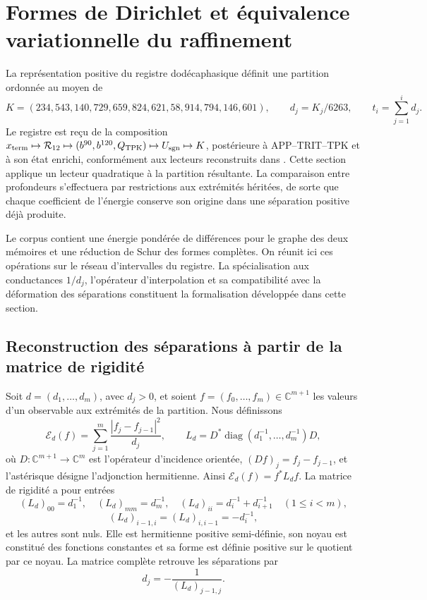 \section{Formes de Dirichlet et équivalence variationnelle du raffinement}
\label{sec:energia-refinamiento-k}

La représentation positive du registre dodécaphasique définit une partition ordonnée au moyen de
\[
 K=(234,543,140,729,659,824,621,58,914,794,146,601),
 \qquad d_j=K_j/6263,
 \qquad t_i=\sum_{j=1}^id_j.
\]
Le registre est reçu de la composition
\(x_{\rm term}\mapsto\mathcal R_{12}\mapsto
(b^{90},b^{120},Q_{\rm TPK})\mapsto U_{\rm sgn}\mapsto K\),
postérieure à APP--TRIT--TPK et à son état enrichi, conformément aux lecteurs
reconstruits dans \cite{hmtX}. Cette section applique
un lecteur quadratique à la partition résultante. La comparaison entre
profondeurs s’effectuera par restrictions aux extrémités héritées, de sorte
que chaque coefficient de l’énergie conserve son origine dans une séparation
positive déjà produite.

Le corpus contient une énergie pondérée de différences pour le graphe des
deux mémoires et une réduction de Schur des formes complètes. On
réunit ici ces opérations sur le réseau d’intervalles du registre. La
spécialisation aux conductances \(1/d_j\), l’opérateur d’interpolation
et sa compatibilité avec la déformation des séparations constituent
la formalisation développée dans cette section.

\subsection{Reconstruction des séparations à partir de la matrice de rigidité}

Soit \(d=(d_1,\ldots,d_m)\), avec \(d_j>0\), et soient
\(f=(f_0,\ldots,f_m)\in\mathbb C^{m+1}\) les valeurs d’un observable
aux extrémités de la partition. Nous définissons
\begin{equation}
 \mathcal E_d(f)=\sum_{j=1}^{m}\frac{|f_j-f_{j-1}|^2}{d_j},
 \qquad L_d=D^*\operatorname{diag}(d_1^{-1},\ldots,d_m^{-1})D,
 \label{eq:energia-intervalar}
\end{equation}
où \(D:\mathbb C^{m+1}\to\mathbb C^m\) est l'opérateur d'incidence orientée, \((Df)_j=f_j-f_{j-1}\), et l'astérisque désigne l'adjonction hermitienne. Ainsi \(\mathcal E_d(f)=f^*L_df\). La matrice de rigidité a pour entrées
\[
 (L_d)_{00}=d_1^{-1},\quad (L_d)_{mm}=d_m^{-1},\quad
 (L_d)_{ii}=d_i^{-1}+d_{i+1}^{-1}\quad(1\le i<m),
\]
\[
 (L_d)_{i-1,i}=(L_d)_{i,i-1}=-d_i^{-1},
\]
et les autres sont nuls. Elle est hermitienne positive semi-définie, son noyau
est constitué des fonctions constantes et sa forme est définie positive
sur le quotient par ce noyau. La matrice complète retrouve les
séparations par
\begin{equation}
 d_j=-\frac1{(L_d)_{j-1,j}}.
 \label{eq:recuperacion-d-rigidez}
\end{equation}


